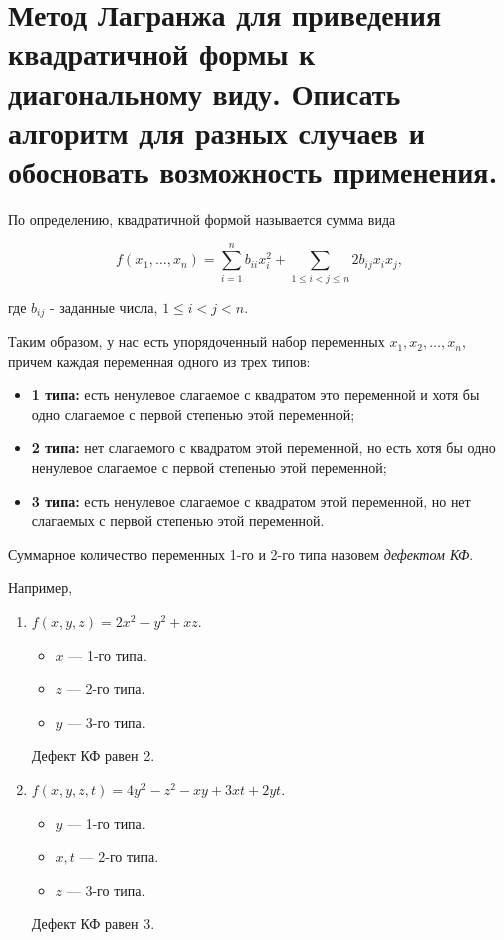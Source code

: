\section{
    Метод Лагранжа для приведения квадратичной формы к диагональному виду. Описать алгоритм для разных случаев и обосновать возможность применения.
}

По определению, квадратичной формой называется сумма вида

$$f(x_1, \ldots, x_n) = \sum_{i=1}^n b_{ii}x_i^2 + \sum_{1 \leq i < j \leq n} 2b_{ij}x_ix_j,$$

где $b_{ij}$ - заданные числа, $1 \leq i < j < n$.

Таким образом, у нас есть упорядоченный набор переменных $x_1, x_2, \ldots, x_n$, причем каждая переменная одного из трех типов:

\begin{itemize}
    \item \textbf{1 типа:} есть ненулевое слагаемое с квадратом это переменной и хотя бы одно слагаемое с первой степенью этой переменной;
    \item \textbf{2 типа:} нет слагаемого с квадратом этой переменной, но есть хотя бы одно ненулевое слагаемое с первой степенью этой переменной;
    \item \textbf{3 типа:} есть ненулевое слагаемое с квадратом этой переменной, но нет слагаемых с первой степенью этой переменной.
\end{itemize}

Суммарное количество переменных 1-го и 2-го типа назовем \textit{дефектом КФ}.

Например, 

\begin{enumerate}
    \item $f(x, y, z) = 2x^2 - y^2 + xz$.

    \begin{itemize}[nosep]
        \item $x$ — 1-го типа.
        \item $z$ — 2-го типа.
        \item $y$ — 3-го типа.
    \end{itemize}
    Дефект КФ равен 2.

    \item $f(x, y, z, t) = 4y^2-z^2-xy+3xt+2yt$.

    \begin{itemize}[nosep]
        \item $y$ — 1-го типа.
        \item $x, t$ — 2-го типа.
        \item $z$ — 3-го типа.
    \end{itemize}
    Дефект КФ равен 3.
\end{enumerate}

